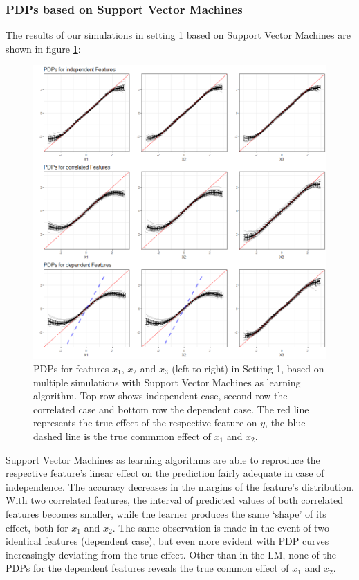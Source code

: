 \documentclass[]{krantz}
\begin{document}
\subsubsection{PDPs based on Support Vector
Machines}\label{pdps-based-on-support-vector-machines}

The results of our simulations in setting 1 based on Support Vector
Machines are shown in figure \ref{fig:Figure16}:

\begin{figure}

\includegraphics[width=1\linewidth]{images/VK_PDP_16_Set1_SVM} \hfill{}

\caption{PDPs for features $x_1$, $x_2$ and $x_3$ (left to right) in Setting 1, based on multiple simulations with Support Vector Machines as learning algorithm. Top row shows independent case, second row the correlated case and bottom row the dependent case. The red line represents the true effect of the respective feature on $y$, the blue dashed line is the true commmon effect of $x_1$ and $x_2$.}\label{fig:Figure16}
\end{figure}

Support Vector Machines as learning algorithms are able to reproduce the
respective feature's linear effect on the prediction fairly adequate in
case of independence. The accuracy decreases in the margins of the
feature's distribution. With two correlated features, the interval of
predicted values of both correlated features becomes smaller, while the
learner produces the same `shape' of its effect, both for \(x_1\) and
\(x_2\). The same observation is made in the event of two identical
features (dependent case), but even more evident with PDP curves
increasingly deviating from the true effect. Other than in the LM, none
of the PDPs for the dependent features reveals the true common effect of
\(x_1\) and \(x_2\).
\end{document}
